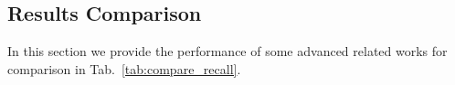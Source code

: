 %	
%	


\subsection{Results Comparison}
In this section we provide the performance of some advanced related works for comparison in Tab.~\ref{tab:compare_recall}.

